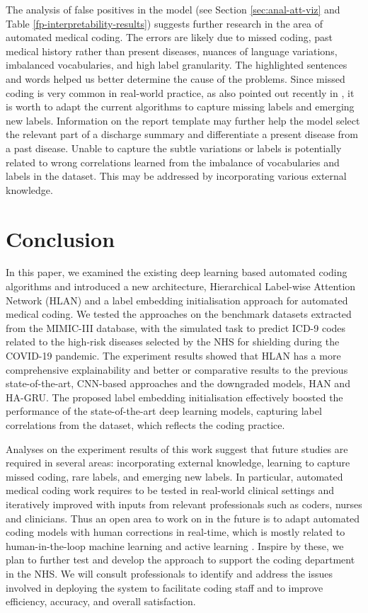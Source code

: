 \documentclass[final,5p,times,twocolumn]{elsarticle}
\begin{document}
The analysis of false positives in the model (see Section \ref{sec:anal-att-viz} and Table \ref{fp-interpretability-results}) suggests further research in the area of automated medical coding. The errors are likely due to missed coding, past medical history rather than present diseases, nuances of language variations, imbalanced vocabularies, and high label granularity. The highlighted sentences and words helped us better determine the cause of the problems. Since missed coding is very common in real-world practice, as also pointed out recently in \cite{searle2020}, it is worth to adapt the current algorithms to capture missing labels and emerging new labels. Information on the report template may further help the model select the relevant part of a discharge summary and differentiate a present disease from a past disease. Unable to capture the subtle variations or labels is potentially related to wrong correlations learned from the imbalance of vocabularies and labels in the dataset. This may be addressed by incorporating various external knowledge.

\section{Conclusion}
\label{conclusion}
In this paper, we examined the existing deep learning based automated coding algorithms and introduced a new architecture, Hierarchical Label-wise Attention Network (HLAN) and a label embedding initialisation approach for automated medical coding. We tested the approaches on the benchmark datasets extracted from the MIMIC-III database, with the simulated task to predict ICD-9 codes related to the high-risk diseases selected by the NHS for shielding during the COVID-19 pandemic. The experiment results showed that HLAN has a more comprehensive explainability and better or comparative results to the previous state-of-the-art, CNN-based approaches and the downgraded models, HAN and HA-GRU. The proposed label embedding initialisation effectively boosted the performance of the state-of-the-art deep learning models, capturing label correlations from the dataset, which reflects the coding practice.

Analyses on the experiment results of this work suggest that future studies are required in several areas: incorporating external knowledge, learning to capture missed coding, rare labels, and emerging new labels. In particular, automated medical coding work requires to be tested in real-world clinical settings and iteratively improved with inputs from relevant professionals such as coders, nurses and clinicians. Thus an open area to work on in the future is to adapt automated coding models with human corrections in real-time, which is mostly related to human-in-the-loop machine learning and active learning \cite{monarch2021}. Inspire by these, we plan to further test and develop the approach to support the coding department in the NHS. We will consult professionals to identify and address the issues involved in deploying the system to facilitate coding staff and to improve efficiency, accuracy, and overall satisfaction.
\end{document}
